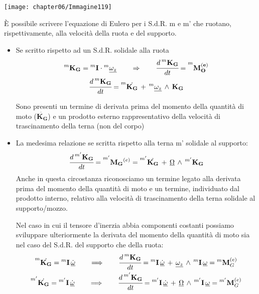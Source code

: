 	\begin{minipage}{.5\textwidth}
		\centering
		\texttt{[image: chapter06/Immagine119]}
	\end{minipage}
	\hfill
	\begin{minipage}{.5\textwidth}
		È possibile scrivere l'equazione di Eulero per i S.d.R. m e m' che ruotano, rispettivamente, alla velocità della ruota e del supporto.
		
		\begin{itemize}
		\item Se scritto rispetto ad un S.d.R. solidale alla ruota
		\begin{gather*}
			\prescript{m}{}{\mathbf{K_G}}{}{} = \prescript{m}{}{\mathbf{\mathbf{I}}}{}{}\cdot \prescript{m}{}{\underline{\omega_z}}{}{}\qquad\Rightarrow\qquad\cfrac{d\prescript{m}{}{\mathbf{K_G}}{}{}}{dt} = \prescript{m}{}{\mathbf{M_O^{(e)}}}{}{}\\
			\cfrac{d\prescript{m}{}{\mathbf{K_G}}{}{}}{dt} = \prescript{m}{}{\dot{\mathbf{K_G}}}{}{}\,+\,\prescript{m}{}{\underline{\omega_z}}{}{}\,\wedge\,\mathbf{K_G}
			\end{gather*}
			
			Sono presenti un termine di derivata prima del momento della quantità di moto ($\dot{\mathbf{K_G}}$) e un prodotto esterno rappresentativo della velocità di trascinamento della terna (non del corpo)
		\end{itemize}
	\end{minipage}
	\begin{itemize}
		\item La medesima relazione se scritta rispetto alla terna m' solidale al supporto:
		\[
			\cfrac{d\prescript{m'}{}{\mathbf{K_G}}{}{}}{dt} = \prescript{m'}{}{\mathbf{M_G}^{(e)}}{}{} = \prescript{m'}{}{\dot{\mathbf{K_G}}}{}{}\,+\,\underline{\Omega}\,\wedge\,\prescript{m'}{}{\mathbf{K_G}}{}{}
		\]
		Anche in questa circostanza riconosciamo un termine legato alla derivata prima del momento della quantità di moto e un termine, individuato dal prodotto interno, relativo alla velocità di trascinamento della terna solidale al supporto/mozzo.
		
		Nel caso in cui il tensore d'inerzia abbia componenti costanti possiamo sviluppare ulteriormente la derivata del momento della quantità di moto sia nel caso del S.d.R. del supporto che della ruota:
		\begin{gather*}
			\prescript{m}{}{\dot{\mathbf{K_G}}}{}{} = \prescript{m}{}{\mathbf{\mathbf{I}}}{}{}\,\dot{\underline{\omega}}\qquad \Longrightarrow\qquad \cfrac{d\prescript{m}{}{\mathbf{K_G}}{}{}}{dt} = \prescript{m}{}{\mathbf{\mathbf{I}}}{}{}\,\dot{\underline{\omega}}\,+\,\underline{\omega_z}\,\wedge\,\prescript{m}{}{\mathbf{\mathbf{I}}}{}{}\,\underline{\omega} = \prescript{m}{}{\mathbf{M}}{^{(e)}_G}\\
			\prescript{m'}{}{\dot{\mathbf{K_G}}}{}{} = \prescript{m'}{}{\mathbf{\mathbf{I}}}{}{}\,\dot{\underline{\omega}}\qquad \Longrightarrow\qquad \cfrac{d\prescript{m'}{}{\mathbf{K_G}}{}{}}{dt} = \prescript{m'}{}{\mathbf{\mathbf{I}}}{}{}\,\dot{\underline{\omega}}\,+\,\underline{\Omega}\,\wedge\,\prescript{m'}{}{\mathbf{\mathbf{I}}}{}{}\,\underline{\omega} = \prescript{m'}{}{\mathbf{M}}{^{(e)}_G}
		\end{gather*}
	\end{itemize}
	
